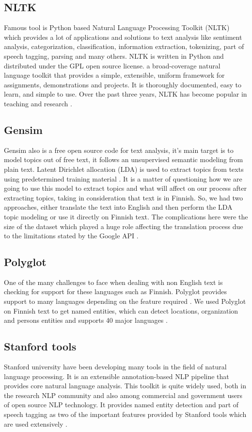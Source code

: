 \documentclass[conference]{IEEEtran}
\begin{document}
\subsection{NLTK}
Famous tool is Python based Natural Language Processing Toolkit (NLTK) which provides a lot of applications and solutions to text analysis like sentiment analysis, categorization, classification, information extraction, tokenizing, part of speech tagging, parsing and many others. NLTK is written in Python and distributed under the GPL open source license. a broad-coverage natural language toolkit that provides a simple, extensible, uniform framework for assignments, demonstrations and projects. It is thoroughly documented, easy to learn, and simple to use. Over the past three years, NLTK has become popular in teaching and research \cite{bird2004nltk}.

\subsection{Gensim}
Gensim also is a free open source code for text analysis, it’s main target is to model topics out of free text, it follows an unsupervised semantic modeling from plain text. Latent Dirichlet allocation (LDA) is used to extract topics from texts using predetermined training material \cite{qiu2014topic}. It is a matter of questioning how we are going to use this model to extract topics and what will affect on our process after extracting topics, taking in consideration that text is in Finnish. So, we had two approaches, either translate the text into English and then perform the LDA topic modeling or use it directly on Finnish text. The complications here were the size of the dataset which played a huge role affecting the translation process due to the limitations stated by the Google API \cite{aiken2011analysis}.

\subsection{Polyglot}
One of the many challenges to face when dealing with non English text is checking for support for these languages such as Finnish. Polyglot provides support to many languages depending on the feature required \cite{al2013polyglot}. We used Polyglot on Finnish text to get named entities, which can detect locations, organization and persons entities and supports 40 major languages \cite{al2015polyglot}.

\subsection{Stanford tools}
Stanford university have been developing many tools in the field of natural language processing. It is an extensible annotation-based NLP pipeline that provides core natural language analysis. This toolkit is quite widely used, both in the research NLP community and also among commercial and government users of open source NLP technology. It provides named entity detection and part of speech tagging as two of the important features provided by Stanford tools which are used extensively \cite{manning2014stanford}.
\end{document}
